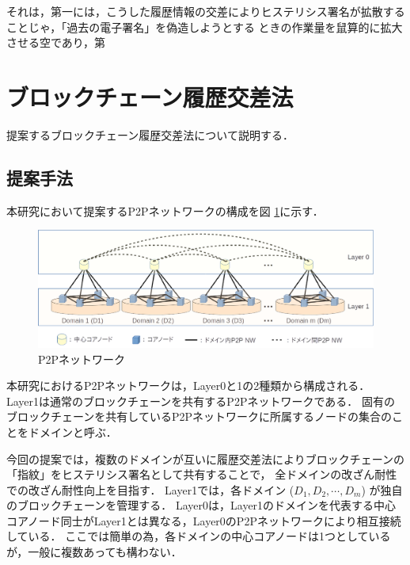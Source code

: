 \documentclass[a4paper,12pt]{jsarticle}
\begin{document}
それは，第一には，こうした履歴情報の交差によりヒステリシス署名が拡散することじゃ，「過去の電子署名」を偽造しようとする
ときの作業量を鼠算的に拡大させる空であり，第

\newpage
\section{ブロックチェーン履歴交差法}
提案するブロックチェーン履歴交差法について説明する．
  \subsection{提案手法}
\label{teian}

本研究において提案するP2Pネットワークの構成を図 \ref{fig:p2p}に示す．
%
%
\begin{figure}[H]%
  \begin{center}
    \includegraphics[width=130mm]{pht/p2p_network_image_r1.eps}
  \end{center}
  \caption{P2Pネットワーク}
  \label{fig:p2p}
\end{figure}


本研究におけるP2Pネットワークは，Layer0と1の2種類から構成される．
Layer1は通常のブロックチェーンを共有するP2Pネットワークである．
固有のブロックチェーンを共有しているP2Pネットワークに所属するノードの集合のことをドメインと呼ぶ．

今回の提案では，複数のドメインが互いに履歴交差法によりブロックチェーンの「指紋」をヒステリシス署名として共有することで，
全ドメインの改ざん耐性での改ざん耐性向上を目指す．
Layer1では，各ドメイン ($D_1, D_2, \cdots, D_m$) が独自のブロックチェーンを管理する．
Layer0は，Layer1のドメインを代表する中心コアノード同士がLayer1とは異なる，Layer0のP2Pネットワークにより相互接続している．
ここでは簡単の為，各ドメインの中心コアノードは1つとしているが，一般に複数あっても構わない．
\end{document}
